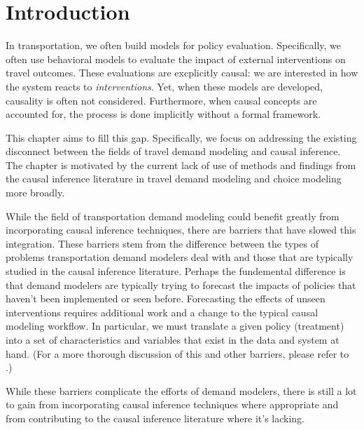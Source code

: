 \section{Introduction}
\label{sec:intro}

In transportation, we often build models for policy evaluation.
Specifically, we often use behavioral models to evaluate the impact of external interventions on travel outcomes. 
These evaluations are excplicitly causal: we are interested in how the 
system reacts to \textit{interventions}. 
Yet, when these models are 
developed, causality is often not considered. Furthermore, when 
causal concepts are accounted for, the process is done implicitly without a 
formal framework. 

This chapter aims to fill this gap. 
Specifically, we focus on addressing the existing disconnect between the fields of travel demand modeling and causal inference. 
The chapter is motivated by the current lack of use of methods and findings from 
the causal inference literature in travel demand modeling and choice modeling more broadly.

While the field of transportation demand modeling could benefit greatly from 
incorporating causal inference techniques, there are barriers that have slowed this integration. 
These barriers stem from the difference between the types of problems transportation demand modelers deal with and those that are typically studied in the causal inference literature. 
Perhaps the fundemental difference is that demand modelers are typically trying to forecast the impacts of policies that haven't been implemented or seen before.
Forecasting the effects of unseen interventions requires additional work and a change to the typical causal modeling workflow.
In particular, we must translate a given policy (treatment) into a set of characteristics and variables that exist in the data and system at hand.
(For a more thorough discussion of this and other barriers, please refer to \citet{brathwaite_2018_causal}.) 

While these barriers complicate the efforts of demand modelers, there is still a lot to gain from
incorporating causal inference techniques where appropriate and from contributing
to the causal inference literature where it's lacking.

